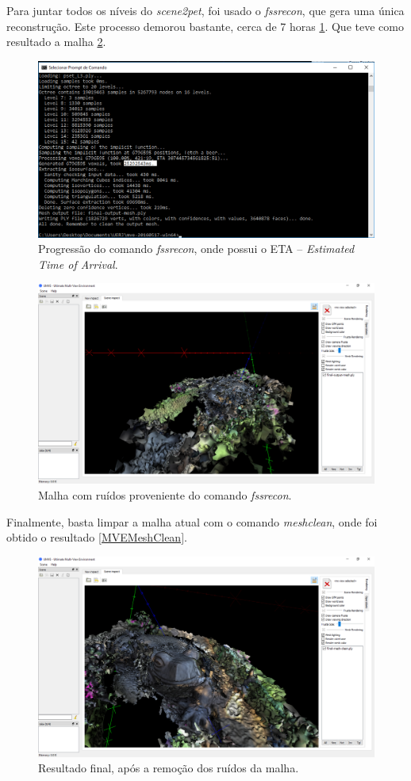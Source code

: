 Para juntar todos os níveis do \emph{scene2pet}, foi usado o \emph{fssrecon}, que gera uma única reconstrução. Este processo demorou bastante, cerca de 7 horas \ref{fig:MVEFSSR}. Que teve como resultado a malha \ref{fig:MVEFSSRMesh}.

\begin{figure}[!h]
	\centering
	\includegraphics[width=0.8\linewidth]{figs/mvemeshtempo2.png}
	\caption{%
	Progressão do comando \emph{fssrecon}, onde possui o ETA -- \emph{Estimated Time of Arrival}.
	}\label{fig:MVEFSSR}
\end{figure} 

\begin{figure}[!h]
	\centering
	\includegraphics[width=1\linewidth]{figs/mvemeshout.png}
	\caption{%
	Malha com ruídos proveniente do comando \emph{fssrecon}.
	}\label{fig:MVEFSSRMesh}
\end{figure} 

Finalmente, basta limpar a malha atual com o comando \emph{meshclean}, onde foi obtido o resultado \ref{MVEMeshClean}.

\begin{figure}[!h]
	\centering
	\includegraphics[width=1\linewidth]{figs/mvemeshclean.png}
	\caption{%
	Resultado final, após a remoção dos ruídos da malha.
	}\label{fig:MVEMeshClean}
\end{figure} 